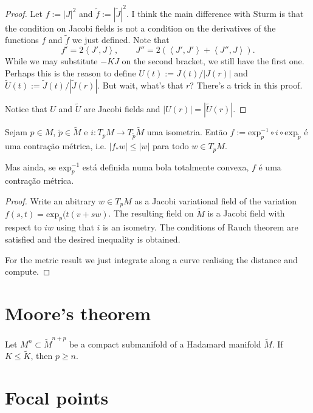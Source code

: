 \begin{proof}
Let $f:=|J|^2$ and
$\tilde{f}:=|\tilde{J}|^2$. I think the main
difference with
Sturm is that the condition on Jacobi fields
is not a condition on the
derivatives of the functions $f$ and
$\tilde{f}$ we just defined. Note that
$$
f'=2\left\langle{}J',J\right\rangle{},\qquad
J''=2(\left\langle{}J',J'\right\rangle{}+\left\langle{}J'',J\right\rangle{}).
$$
While we may substitute $-KJ$ on the second
bracket, we still have the first
one. Perhaps this is the reason to define
$U(t):=J(t)/|J(r)|$ and
$\tilde{U}(t):=\tilde{J}(t)/|\tilde{J}(r)|$.
But wait, what's that $r$? There's
a trick in this proof.

Notice that $U$ and $\tilde{U}$ are Jacobi
fields and $|U(r)|=|\tilde{U}(r)|$.
\end{proof}

\begin{proposition}
\label{proposition-contraction}
Sejam $p \in M$, $\tilde{p} \in \tilde{M}$ e
$i:T_pM \to T_{\tilde{p}}\tilde{M}$
uma isometria. Então $f:=\text{exp}^{-1}_p
\circ i \circ
\text{exp}_{\tilde{p}}$ é uma contração
métrica, i.e. $|f_*w|\leq |w|$
para todo $w \in T_pM$.

Mas ainda, se $\text{exp}_p^{-1}$ está
definida numa bola totalmente
convexa, $f$ é uma contração métrica.
\end{proposition}

\begin{proof}
Write an abitrary $w\in T_p M$ as a Jacobi
variational field of the variation
$f(s,t)=\text{exp}_p(t(v+sw)$. The resulting
field on $\tilde{M}$ is a
Jacobi field with respect to $iw$ using that
$i$ is an isometry. The conditions
of Rauch theorem are satisfied and the
desired inequality is obtained.

For the metric result we just integrate along
a curve realising the distance and
compute.
\end{proof}

\section{Moore's theorem}
\label{section-Moore}

\begin{theorem}[Moore]
\label{theorem-Moore}
Let $M^n \subset \tilde{M}^{n+p}$ be a
compact submanifold of a Hadamard
manifold $\tilde{M}$. If $K\leq \tilde{K}$,
then $p\geq n$.
\end{theorem}

\section{Focal points}
\label{section-focal points}

